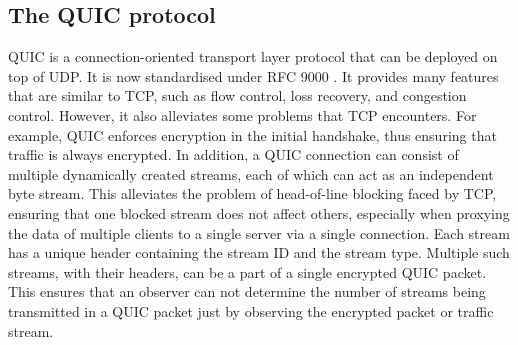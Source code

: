 \subsection{The QUIC protocol}
\label{subsec:netshaper-background-quic}

QUIC is a connection-oriented transport layer protocol that can be deployed on top of UDP.
It is now standardised under RFC 9000 \cite{quic_rfc}.
It provides many features that are similar to TCP, such as flow control, loss recovery, and congestion control. 
However, it also alleviates some problems that TCP encounters.
For example, QUIC enforces encryption in the initial handshake, thus ensuring that traffic is always encrypted.
In addition, a QUIC connection can consist of multiple dynamically created streams, each of which can act as an independent byte stream. 
This alleviates the problem of head-of-line blocking faced by TCP, ensuring that one blocked stream does not affect others, especially when proxying the data of multiple clients to a single server via a single connection.
Each stream has a unique header containing the stream ID and the stream type.
Multiple such streams, with their headers, can be a part of a single encrypted QUIC packet.
This ensures that an observer can not determine the number of streams being transmitted in a QUIC packet just by observing the encrypted packet or traffic stream.


